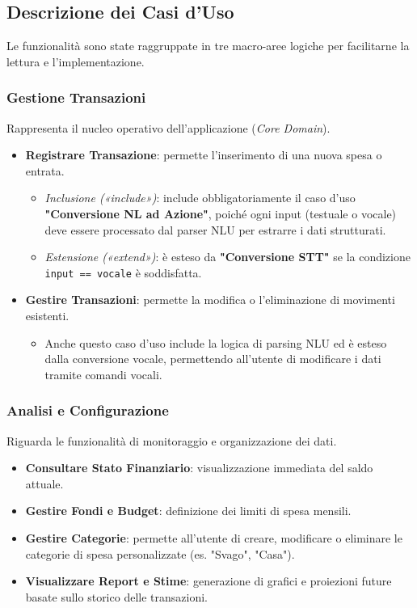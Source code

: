 \subsection{Descrizione dei Casi d'Uso}

Le funzionalità sono state raggruppate in tre macro-aree logiche per facilitarne la lettura e l'implementazione.



\subsubsection{Gestione Transazioni}
Rappresenta il nucleo operativo dell'applicazione (\textit{Core Domain}).
\begin{itemize}
    \item \textbf{Registrare Transazione}: permette l'inserimento di una nuova spesa o entrata.
          \begin{itemize}
              \item \textit{Inclusione («include»)}: include obbligatoriamente il caso d'uso \textbf{"Conversione NL ad Azione"}, poiché ogni input (testuale o vocale) deve essere processato dal parser NLU per estrarre i dati strutturati.
              \item \textit{Estensione («extend»)}: è esteso da \textbf{"Conversione STT"} se la condizione \texttt{input == vocale} è soddisfatta.
          \end{itemize}
    \item \textbf{Gestire Transazioni}: permette la modifica o l'eliminazione di movimenti esistenti.
          \begin{itemize}
              \item Anche questo caso d'uso include la logica di parsing NLU ed è esteso dalla conversione vocale, permettendo all'utente di modificare i dati tramite comandi vocali.
          \end{itemize}
\end{itemize}

\subsubsection{Analisi e Configurazione}
Riguarda le funzionalità di monitoraggio e organizzazione dei dati.
\begin{itemize}
    \item \textbf{Consultare Stato Finanziario}: visualizzazione immediata del saldo attuale.
    \item \textbf{Gestire Fondi e Budget}: definizione dei limiti di spesa mensili.
    \item \textbf{Gestire Categorie}: permette all'utente di creare, modificare o eliminare le categorie di spesa personalizzate (es. "Svago", "Casa").
    \item \textbf{Visualizzare Report e Stime}: generazione di grafici e proiezioni future basate sullo storico delle transazioni.
\end{itemize}

